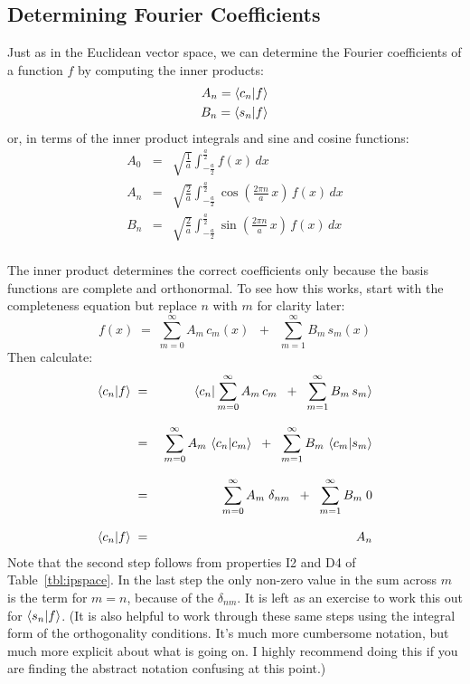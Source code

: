 \documentclass[12pt]{book}
\begin{document}
\subsection{Determining Fourier Coefficients}
\label{sect:coeff}

Just as in the Euclidean vector space, we can determine the Fourier coefficients of a function $f$ by computing the inner products:
\begin{eqnarray*}
A_n = \braket{c_n| f} \\
B_n = \braket{s_n| f}
\end{eqnarray*}
or, in terms of the inner product integrals and sine and cosine functions:
\begin{eqnarray*}
A_0 &=& \sqrt{\frac{1}{a}} \int_{-\frac{a}{2}}^{\frac{a}{2}} f(x) \, dx \\
A_n &=& \sqrt{\frac{2}{a}} \int_{-\frac{a}{2}}^{\frac{a}{2}} 
\cos\left(\frac{2\pi n}{a} \, x \right) \, f(x) \, dx \\
B_n &=& \sqrt{\frac{2}{a}} \int_{-\frac{a}{2}}^{\frac{a}{2}} 
\sin\left(\frac{2\pi n}{a} \, x \right) \, f(x) \, dx \\
\end{eqnarray*}


The inner product determines the correct coefficients only because the basis functions are complete and orthonormal.  To see how this works, start with the completeness equation but replace $n$ with $m$ for clarity later:
\begin{equation*}
f(x) \; = \; \sum_{m=0}^{\infty}  A_m \, c_m(x)  \; \; + \; \; \sum_{m=1}^{\infty} B_m \, s_m(x)
\end{equation*}
Then calculate:
\begin{eqnarray*}
  \braket{c_n| f} \; &=& \; \braket{c_n | \sum_{m=0}^{\infty}  A_m \, c_m  \; \; + \; \; \sum_{m=1}^{\infty} B_m \, s_m }\\[8pt]
  &=& \; \sum_{m=0}^{\infty}  A_m \, \braket{c_n| c_m}  \; \; + \; \; \sum_{m=1}^{\infty} B_m \, \braket{c_m| s_m} \\[8pt]
 &=& \; \sum_{m=0}^{\infty}  A_m \; \delta_{nm}  \; \; + \; \; \sum_{m=1}^{\infty} B_m \; 0 \\[8pt]
\braket{c_n| f} \; &=& A_n \\
\end{eqnarray*}
Note that the second step follows from properties I2 and D4 of
Table~\ref{tbl:ipspace}.  In the last step the only non-zero value in
the sum across $m$ is the term for $m=n$, because of the
$\delta_{nm}$.  It is left as an exercise to work this out for
$\braket{s_n | f}$.  (It is also helpful to work through these same
steps using the integral form of the orthogonality conditions.  It's
much more cumbersome notation, but much more explicit about what is
going on.  I highly recommend doing this if you are finding the
abstract notation confusing at this point.)
\end{document}
